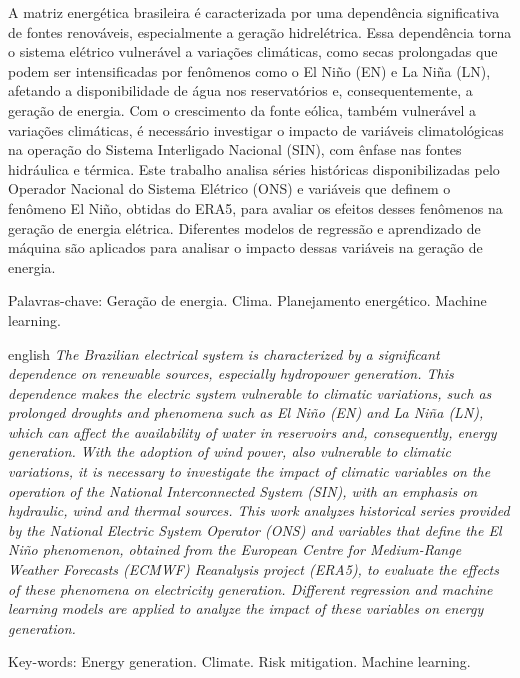 \begin{resumo}
\noindent
A matriz energética brasileira é caracterizada por uma dependência significativa de fontes renováveis, especialmente a
geração hidrelétrica. Essa dependência torna o sistema elétrico vulnerável a variações climáticas, como secas 
prolongadas que podem ser intensificadas por fenômenos como o El Niño (EN) e La Niña (LN), afetando a disponibilidade 
de água nos reservatórios e, consequentemente, a geração de energia. Com o crescimento da fonte eólica, também vulnerável a 
variações climáticas, é necessário investigar o impacto de variáveis climatológicas na operação do Sistema Interligado Nacional 
(SIN), com ênfase nas fontes hidráulica e térmica. Este trabalho analisa séries históricas disponibilizadas pelo Operador Nacional 
do Sistema Elétrico (ONS) e variáveis que definem o fenômeno El Niño, obtidas do ERA5, para avaliar os efeitos desses fenômenos
na geração de energia elétrica. Diferentes modelos de regressão e aprendizado de máquina são aplicados para analisar
o impacto dessas variáveis na geração de energia.

\vspace{0.2cm}
\noindent
Palavras-chave: Geração de energia. Clima. Planejamento energético. Machine learning.
\end{resumo}

\begin{resumo}[Abstract]	
\begin{otherlanguage*}{english}
\noindent 
\textit{The Brazilian electrical system is characterized by a significant dependence on renewable sources, especially hydropower generation. 
This dependence makes the electric system vulnerable to climatic variations, such as prolonged droughts and phenomena such as
El Niño (EN) and La Niña (LN), which can affect the availability of water in reservoirs and, consequently, energy generation. 
With the adoption of wind power, also vulnerable to climatic variations, it is necessary to investigate the impact of 
climatic variables on the operation of the National Interconnected System (SIN), with an emphasis on hydraulic, wind and 
thermal sources. This work analyzes historical series provided by the National Electric System Operator (ONS) and variables 
that define the El Niño phenomenon, obtained from the European Centre for Medium-Range Weather Forecasts (ECMWF) 
Reanalysis project (ERA5), to evaluate the effects of these phenomena on electricity generation. 
Different regression and machine learning models are applied to analyze the impact of these variables on energy generation.}

\vspace{0.2cm}
\noindent
Key-words: Energy generation. Climate. Risk mitigation. Machine learning.
\end{otherlanguage*}
\end{resumo}